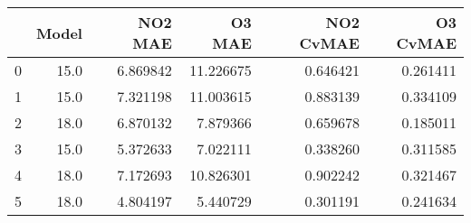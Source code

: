 \begin{tabular}{lrrrrr}
\toprule
{} &  Model &   NO2 MAE &     O3 MAE &  NO2 CvMAE &  O3 CvMAE \\
\midrule
0 &   15.0 &  6.869842 &  11.226675 &   0.646421 &  0.261411 \\
1 &   15.0 &  7.321198 &  11.003615 &   0.883139 &  0.334109 \\
2 &   18.0 &  6.870132 &   7.879366 &   0.659678 &  0.185011 \\
3 &   15.0 &  5.372633 &   7.022111 &   0.338260 &  0.311585 \\
4 &   18.0 &  7.172693 &  10.826301 &   0.902242 &  0.321467 \\
5 &   18.0 &  4.804197 &   5.440729 &   0.301191 &  0.241634 \\
\bottomrule
\end{tabular}
